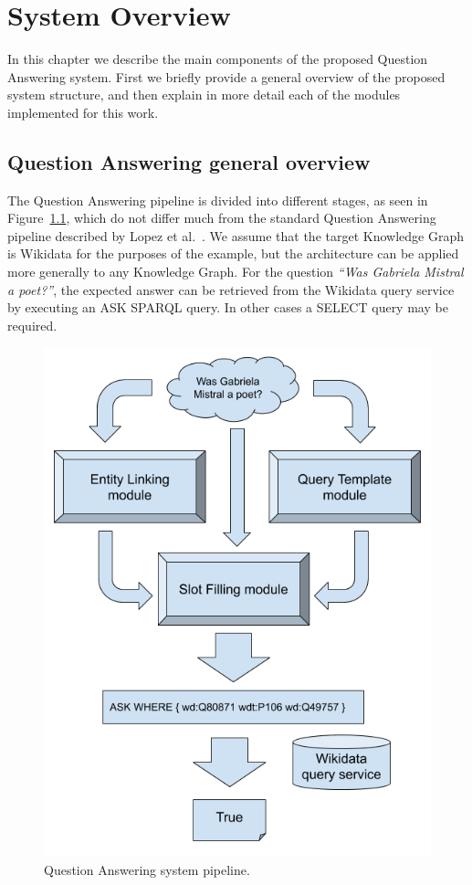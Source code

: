 \chapter{System Overview}
\label{cap3:system}
In this chapter we describe the main components of the proposed Question Answering system. 
First we briefly provide a general overview of the proposed system structure, and then explain 
in more detail each of the modules implemented for this work.

\section{Question Answering general overview}
\label{cap3:system/qaPipeline}
The Question Answering pipeline is divided into different stages, as seen in 
Figure~\ref{fig:questionAnsweringOverview}, which do not differ much from the standard 
Question Answering pipeline described by Lopez et al.~\cite{qa:core-techniques-DiefenbachLSM18}. 
We assume that the target Knowledge Graph is Wikidata for the purposes of the example, but 
the architecture can be applied more generally to any Knowledge Graph. For the question 
\textit{“Was Gabriela Mistral a poet?”}, the expected answer can be retrieved from the 
Wikidata query service by executing an ASK SPARQL query. In other cases a SELECT query may be 
required.

\begin{figure}[!h]
    \centering
    \includegraphics[scale=.45]{imagenes/3_system_overview/questionAnsweringPipeline.png}
    \caption{Question Answering system pipeline.}
    \label{fig:questionAnsweringOverview}
\end{figure}

